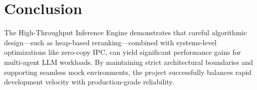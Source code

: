 \documentclass[10pt,twocolumn,letterpaper]{article}
\begin{document}
\section{Conclusion}
The High-Throughput Inference Engine demonstrates that careful algorithmic design—such as heap-based reranking—combined with systems-level optimizations like zero-copy IPC, can yield significant performance gains for multi-agent LLM workloads. By maintaining strict architectural boundaries and supporting seamless mock environments, the project successfully balances rapid development velocity with production-grade reliability.
\end{document}
